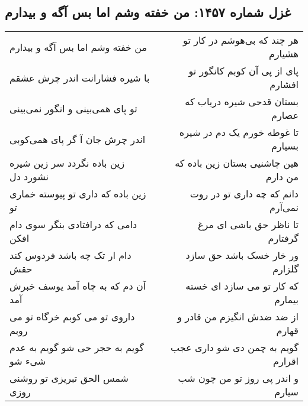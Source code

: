 \begin{center}
\section*{غزل شماره ۱۴۵۷: من خفته وشم اما بس آگه و بیدارم}
\label{sec:1457}
\begin{longtable}{l p{0.5cm} r}
من خفته وشم اما بس آگه و بیدارم
&&
هر چند که بی‌هوشم در کار تو هشیارم
\\
با شیره فشارانت اندر چرش عشقم
&&
پای از پی آن کوبم کانگور تو افشارم
\\
تو پای همی‌بینی و انگور نمی‌بینی
&&
بستان قدحی شیره دریاب که عصارم
\\
اندر چرش جان آ گر پای همی‌کوبی
&&
تا غوطه خورم یک دم در شیره بسیارم
\\
زین باده نگردد سر زین شیره نشورد دل
&&
هین چاشنیی بستان زین باده که من دارم
\\
زین باده که داری تو پیوسته خماری تو
&&
دانم که چه داری تو در روت نمی‌آرم
\\
دامی که درافتادی بنگر سوی دام افکن
&&
تا ناظر حق باشی ای مرغ گرفتارم
\\
دام ار تک چه باشد فردوس کند حقش
&&
ور خار خسک باشد حق سازد گلزارم
\\
آن دم که به چاه آمد یوسف خبرش آمد
&&
که کار تو می سازد ای خسته بیمارم
\\
داروی تو می کوبم خرگاه تو می روبم
&&
از ضد ضدش انگیزم من قادر و قهارم
\\
گویم به حجر حی شو گویم به عدم شیء شو
&&
گویم به چمن دی شو داری عجب اقرارم
\\
شمس الحق تبریزی تو روشنی روزی
&&
و اندر پی روز تو من چون شب سیارم
\\
\end{longtable}
\end{center}
